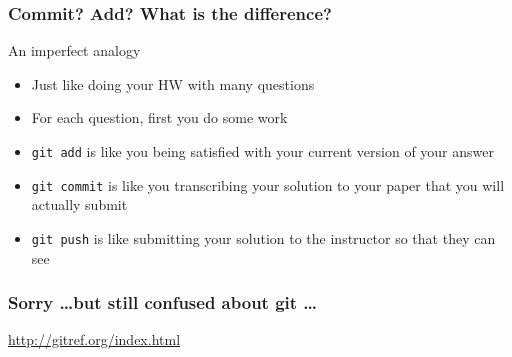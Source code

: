 \documentclass[hyperref={colorlinks=false},handout,10pt]{beamer}
\let\olditem\item
\renewcommand{\item}{\setlength{\itemsep}{0.5\baselineskip}\olditem}
\begin{document}
\begin{frame}
    \frametitle{Commit? Add? What is the difference?}
    \begin{block}{An imperfect analogy}
        \begin{itemize}
            \item Just like doing your HW with many questions
            \item For each question, first you do some work
            \item \texttt{git add} is like you being satisfied with your current
                version of your answer
            \item \texttt{git commit} is like you transcribing your solution to your
                paper that you will actually submit
            \item \texttt{git push} is like submitting your solution to the
                instructor so that they can see
        \end{itemize}
    \end{block}
\end{frame}

\begin{frame}
    \frametitle{Sorry \ldots but still confused about git \ldots}
    \begin{center}
        \href{http://gitref.org/index.html}{http://gitref.org/index.html}
    \end{center}
\end{frame}
\end{document}
